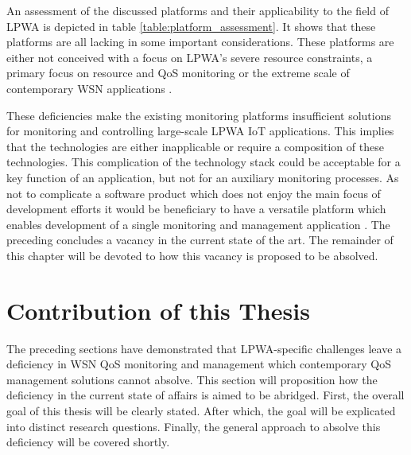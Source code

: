 An assessment of the discussed platforms and their applicability to the field of LPWA is depicted in table \ref{table:platform_assessment}. It shows that these platforms are all lacking in some important considerations. These platforms are either not conceived with a focus on LPWA's severe resource constraints, a primary focus on resource and QoS monitoring or the extreme scale of contemporary WSN applications \cite{platforms,forrester,study_of_various,good_assessment}.

These deficiencies make the existing monitoring platforms insufficient solutions for monitoring and controlling large-scale LPWA IoT applications. This implies that the technologies are either inapplicable or require a composition of these technologies. This complication of the technology stack could be acceptable for a key function of an application, but not for an auxiliary monitoring processes. As not to complicate a software product which does not enjoy the main focus of development efforts it would be beneficiary to have a versatile platform which enables development of a single monitoring and management application \cite{qos_multi_layer_strategies}. The preceding concludes a vacancy in the current state of the art. The remainder of this chapter will be devoted to how this vacancy is proposed to be absolved.

\section{Contribution of this Thesis}
The preceding sections have demonstrated that LPWA-specific challenges leave a deficiency in WSN QoS monitoring and management which contemporary QoS management solutions cannot absolve. This section will proposition how the deficiency in the current state of affairs is aimed to be abridged. First, the overall goal of this thesis will be clearly stated. After which, the goal will be explicated into distinct research questions. Finally, the general approach to absolve this deficiency will be covered shortly.
